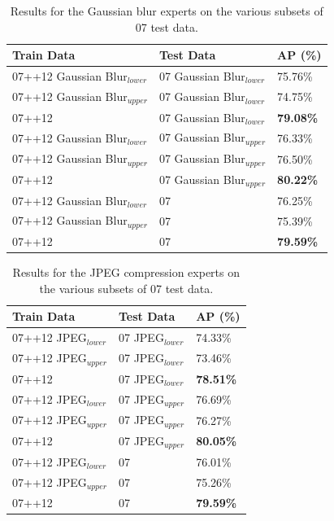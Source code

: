 \begin{table}[h]
\centering
\caption{Results for the Gaussian blur experts on the various subsets of 07 test data.}
\label{tab:gb_experts}
\begin{tabular}{|l|l|l|}
\hline
\textbf{Train Data}           & \textbf{Test Data}        & \textbf{AP (\%)} \\ \hline
07++12 Gaussian Blur$_{lower}$ & 07 Gaussian Blur$_{lower}$ & 75.76\% \\ \hline
07++12 Gaussian Blur$_{upper}$ & 07 Gaussian Blur$_{lower}$ & 74.75\% \\ \hline
07++12               & 07 Gaussian Blur$_{lower}$ & \textbf{79.08\%} \\ \hline
07++12 Gaussian Blur$_{lower}$ & 07 Gaussian Blur$_{upper}$ & 76.33\% \\ \hline
07++12 Gaussian Blur$_{upper}$ & 07 Gaussian Blur$_{upper}$ & 76.50\% \\ \hline
07++12               & 07 Gaussian Blur$_{upper}$ & \textbf{80.22\%} \\ \hline
07++12 Gaussian Blur$_{lower}$ & 07               & 76.25\% \\ \hline
07++12 Gaussian Blur$_{upper}$ & 07               & 75.39\% \\ \hline
07++12               & 07               & \textbf{79.59\%} \\ \hline
\end{tabular}
\end{table}



\begin{table}[h]
\centering
\caption{Results for the JPEG compression experts on the various subsets of 07 test data.}
\label{tab:jpeg_experts}
\begin{tabular}{|l|l|l|}
\hline
\textbf{Train Data}           & \textbf{Test Data}        & \textbf{AP (\%)} \\ \hline
07++12 JPEG$_{lower}$ & 07 JPEG$_{lower}$ & 74.33\% \\ \hline
07++12 JPEG$_{upper}$ & 07 JPEG$_{lower}$ & 73.46\% \\ \hline
07++12               & 07 JPEG$_{lower}$ & \textbf{78.51\%} \\ \hline
07++12 JPEG$_{lower}$ & 07 JPEG$_{upper}$ & 76.69\% \\ \hline
07++12 JPEG$_{upper}$ & 07 JPEG$_{upper}$ & 76.27\% \\ \hline
07++12               & 07 JPEG$_{upper}$ & \textbf{80.05\%} \\ \hline
07++12 JPEG$_{lower}$ & 07               & 76.01\% \\ \hline
07++12 JPEG$_{upper}$ & 07               & 75.26\% \\ \hline
07++12               & 07               & \textbf{79.59\%} \\ \hline
\end{tabular}
\end{table}

